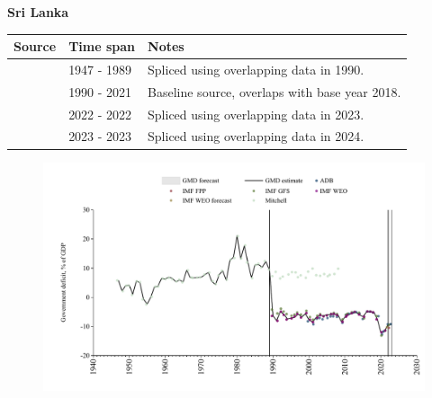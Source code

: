 \documentclass[12pt,a4paper,landscape]{article}
\begin{document}
\begin{adjustbox}{max totalsize={\paperwidth}{\paperheight},center}
\begin{minipage}[t][\textheight][t]{\textwidth}
\vspace*{0.5cm}
{}
\begin{center}
{\Large\bfseries Sri Lanka}
\end{center}
\vspace{0.5cm}
\begin{table}[H]
\centering
\small
\begin{tabular}{|l|l|l|}
\hline
\textbf{Source} & \textbf{Time span} & \textbf{Notes} \\
\hline
\rowcolor{white}\cite{Mitchell}& 1947 - 1989 &Spliced using overlapping data in 1990.\\
\rowcolor{lightgray}\cite{IMF_WEO}& 1990 - 2021 &Baseline source, overlaps with base year 2018.\\
\rowcolor{white}\cite{IMF_GFS}& 2022 - 2022 &Spliced using overlapping data in 2023.\\
\rowcolor{lightgray}\cite{ADB}& 2023 - 2023 &Spliced using overlapping data in 2024.\\
\hline
\end{tabular}
\end{table}
\begin{figure}[H]
\centering
\includegraphics[width=\textwidth,height=0.6\textheight,keepaspectratio]{graphs/LKA_govdef_GDP.pdf}
\end{figure}
\end{minipage}
\end{adjustbox}
\end{document}

